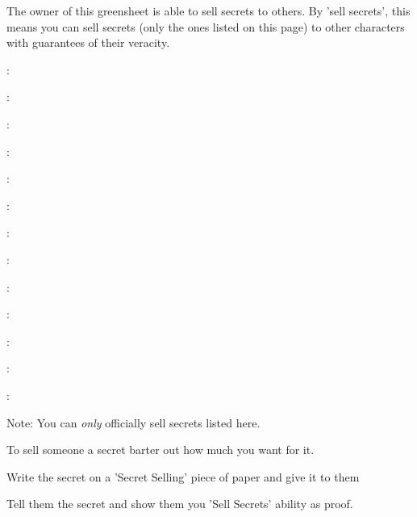 \documentclass[green]{guildcamp3}
\begin{document}
\name{\gSecrets{}}


The owner of this greensheet is able to sell secrets to others. By 'sell secrets', this means you can sell secrets (only the ones listed on this page) to other characters with guarantees of their veracity. 

\cSciOne{\intro}:

\cSciTwo{\intro}:

\cMageOne{\intro}:

\cMageTwo{\intro}:

\cNobleOne{\intro}:

\cPoliOne{\intro}:

\cPoliTwo{\intro}:

\cRogueOne{\intro}:

\cRogueTwo{\intro}:

\cPaladin{\intro}:

\cTech{\intro}:

\cServant{\intro}:

\cSpecOpOne{\intro}:

Note: You can \emph{only} officially sell secrets listed here.

\begin{enum}[Directions]
  \item To sell someone a secret barter out how much you want for it.
  \item Write the secret on a 'Secret Selling' piece of paper and give it to them 
  \item Tell them the secret and show them you 'Sell Secrets' ability as proof. 
\end{enum}
\end{document}
